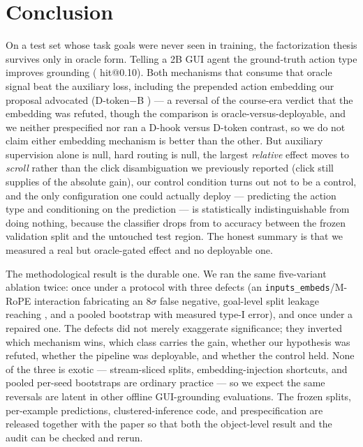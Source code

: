 \section{Conclusion}

On a test set whose task goals were never seen in training, the
factorization thesis survives only in oracle form. Telling a 2B GUI agent
the ground-truth action type improves grounding
(\ConfDhvsA{} hit@0.10). Both mechanisms that consume that oracle signal
beat the auxiliary loss, including the prepended action embedding our
proposal advocated (D-token$-$B \ConfDtvsB{}) --- a reversal of the
course-era verdict that the embedding was refuted, though the comparison is
oracle-versus-deployable, and we neither prespecified nor ran a D-hook
versus D-token contrast, so we do not claim either embedding mechanism is
better than the other. But auxiliary supervision alone is null, hard
routing is null, the largest \emph{relative} effect moves to \emph{scroll}
rather than the click disambiguation we previously reported (click still
supplies \ConfClickAbsShare{} of the absolute gain), our control condition
turns out not to be a control, and the only configuration one could
actually deploy --- predicting the action type and conditioning on the
prediction --- is statistically indistinguishable from doing nothing,
because the classifier drops from \ConfStageOneValAcc{} to
\ConfStageOneAcc{} accuracy between the frozen validation split and the
untouched test region. The honest summary is that we measured a real but
oracle-gated effect and no deployable one.

The methodological result is the durable one. We ran the same five-variant
ablation twice: once under a protocol with three defects (an
\texttt{inputs\_embeds}/M-RoPE interaction fabricating an $8\sigma$ false
negative, goal-level split leakage reaching \LeakGoalMax{}, and a pooled
bootstrap with \TypeIPooled{} measured type-I error), and once under a
repaired one. The defects did not merely exaggerate significance; they
inverted which mechanism wins, which class carries the gain, whether our
hypothesis was refuted, whether the pipeline was deployable, and whether
the control held. None of the three is exotic --- stream-sliced splits,
embedding-injection shortcuts, and pooled per-seed bootstraps are ordinary
practice --- so we expect the same reversals are latent in other offline
GUI-grounding evaluations. The frozen splits, per-example predictions,
clustered-inference code, and prespecification are released together with
the paper so that both the object-level result and the audit can be checked
and rerun.

